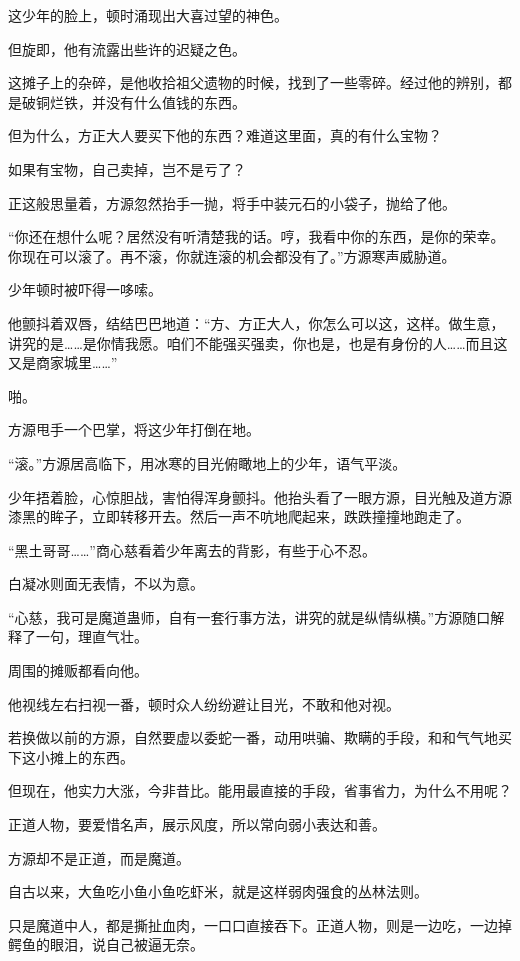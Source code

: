 \begin{this_body}
这少年的脸上，顿时涌现出大喜过望的神色。

但旋即，他有流露出些许的迟疑之色。

这摊子上的杂碎，是他收拾祖父遗物的时候，找到了一些零碎。经过他的辨别，都是破铜烂铁，并没有什么值钱的东西。

但为什么，方正大人要买下他的东西？难道这里面，真的有什么宝物？

如果有宝物，自己卖掉，岂不是亏了？

正这般思量着，方源忽然抬手一抛，将手中装元石的小袋子，抛给了他。

“你还在想什么呢？居然没有听清楚我的话。哼，我看中你的东西，是你的荣幸。你现在可以滚了。再不滚，你就连滚的机会都没有了。”方源寒声威胁道。

少年顿时被吓得一哆嗦。

他颤抖着双唇，结结巴巴地道：“方、方正大人，你怎么可以这，这样。做生意，讲究的是……是你情我愿。咱们不能强买强卖，你也是，也是有身份的人……而且这又是商家城里……”

啪。

方源甩手一个巴掌，将这少年打倒在地。

“滚。”方源居高临下，用冰寒的目光俯瞰地上的少年，语气平淡。

少年捂着脸，心惊胆战，害怕得浑身颤抖。他抬头看了一眼方源，目光触及道方源漆黑的眸子，立即转移开去。然后一声不吭地爬起来，跌跌撞撞地跑走了。

“黑土哥哥……”商心慈看着少年离去的背影，有些于心不忍。

白凝冰则面无表情，不以为意。

“心慈，我可是魔道蛊师，自有一套行事方法，讲究的就是纵情纵横。”方源随口解释了一句，理直气壮。

周围的摊贩都看向他。

他视线左右扫视一番，顿时众人纷纷避让目光，不敢和他对视。

若换做以前的方源，自然要虚以委蛇一番，动用哄骗、欺瞒的手段，和和气气地买下这小摊上的东西。

但现在，他实力大涨，今非昔比。能用最直接的手段，省事省力，为什么不用呢？

正道人物，要爱惜名声，展示风度，所以常向弱小表达和善。

方源却不是正道，而是魔道。

自古以来，大鱼吃小鱼小鱼吃虾米，就是这样弱肉强食的丛林法则。

只是魔道中人，都是撕扯血肉，一口口直接吞下。正道人物，则是一边吃，一边掉鳄鱼的眼泪，说自己被逼无奈。


\end{this_body}
